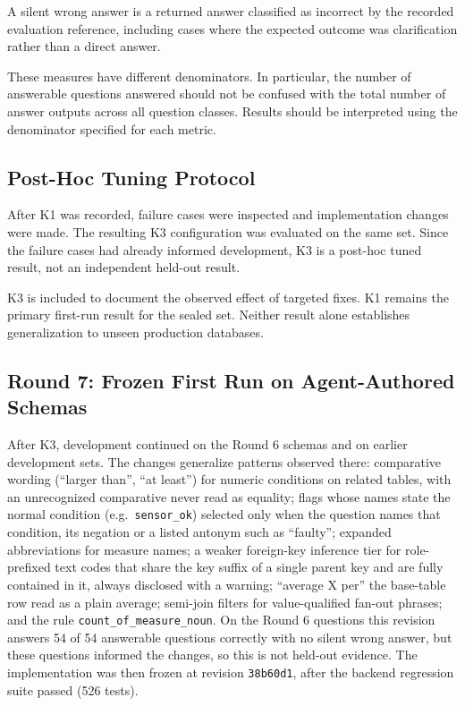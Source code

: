 \documentclass[conference]{IEEEtran}
\begin{document}
A silent wrong answer is a returned answer classified as incorrect by the recorded evaluation reference, including cases where the expected outcome was clarification rather than a direct answer.

These measures have different denominators. In particular, the number of answerable questions answered should not be confused with the total number of answer outputs across all question classes. Results should be interpreted using the denominator specified for each metric.

\subsection{Post-Hoc Tuning Protocol}

After K1 was recorded, failure cases were inspected and implementation changes were made. The resulting K3 configuration was evaluated on the same set. Since the failure cases had already informed development, K3 is a post-hoc tuned result, not an independent held-out result.

K3 is included to document the observed effect of targeted fixes. K1 remains the primary first-run result for the sealed set. Neither result alone establishes generalization to unseen production databases.

\subsection{Round 7: Frozen First Run on Agent-Authored Schemas}
\label{sec:r7method}

After K3, development continued on the Round 6 schemas and on earlier development sets. The changes generalize patterns observed there: comparative wording (``larger than'', ``at least'') for numeric conditions on related tables, with an unrecognized comparative never read as equality; flags whose names state the normal condition (e.g.\ \texttt{sensor\_ok}) selected only when the question names that condition, its negation or a listed antonym such as ``faulty''; expanded abbreviations for measure names; a weaker foreign-key inference tier for role-prefixed text codes that share the key suffix of a single parent key and are fully contained in it, always disclosed with a warning; ``average X per'' the base-table row read as a plain average; semi-join filters for value-qualified fan-out phrases; and the rule \texttt{count\_\allowbreak{}of\_\allowbreak{}measure\_\allowbreak{}noun}. On the Round 6 questions this revision answers 54 of 54 answerable questions correctly with no silent wrong answer, but these questions informed the changes, so this is not held-out evidence. The implementation was then frozen at revision \texttt{38b60d1}, after the backend regression suite passed (526 tests).
\end{document}
